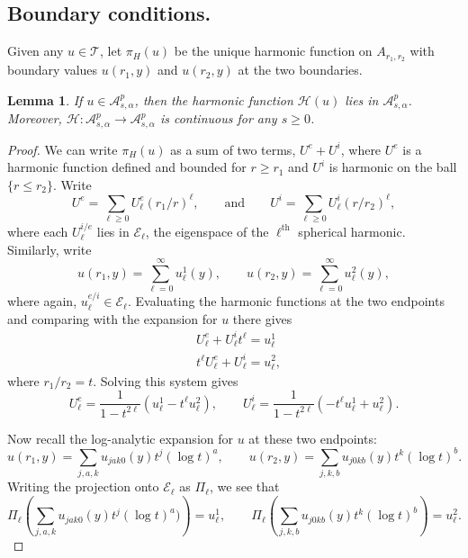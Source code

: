 \documentclass[12pt]{article}
\newtheorem{lem}[thm]{Lemma}
\newcommand{\calA}{{\mathcal A}}
\newcommand{\calE}{{\mathcal E}}
\newcommand{\calH}{\mathcal H}
\newcommand{\calT}{{\mathcal T}}
\begin{document}
\subsection{Boundary conditions.}
Given any $u \in\calT$, let $\pi_H(u)$ be the unique harmonic function on $A_{r_1,r_2}$ with boundary values
$u(r_1,y)$ and $u(r_2, y)$ at the two boundaries.  

\begin{lem}
If $u \in \calA^p_{s,\alpha}$, then the harmonic function $\calH(u)$ lies in $\calA^p_{s,\alpha}$. Moreover, 
$\calH: \calA^p_{s,\alpha} \to \calA^p_{s,\alpha}$ is continuous for any $s \geq 0$.
\end{lem}
\begin{proof}
We can write $\pi_H(u)$ as a sum of two terms, $U^e + U^i$, where $U^e$ is a harmonic function defined and bounded 
for $r \geq r_1$ and $U^i$ is harmonic on the ball $\{r \leq r_2\}$.  Write 
\[
U^e = \sum_{\ell \geq 0} U_\ell^e (r_1/r)^\ell, \qquad \mbox{and}\qquad U^i = \sum_{\ell \geq 0} U_\ell^i (r/r_2)^{\ell},
\]
where each $U_{\ell}^{i/e}$ lies in $\calE_\ell$, the eigenspace of the $\ell^{\mathrm{th}}$ spherical harmonic.  
Similarly, write
\[
u(r_1, y) = \sum_{\ell = 0}^\infty  u_\ell^1(y), \qquad u(r_2, y) = \sum_{\ell=0}^\infty u_\ell^2(y),
\]
where again, $u_\ell^{e/i} \in \calE_\ell$.  Evaluating the harmonic functions at the two endpoints
and comparing with the expansion for $u$ there gives 
\[
\begin{split}
& U_\ell^e + U_\ell^i t^\ell = u_\ell^1 \\
& t^\ell U_\ell^e + U_\ell^i = u_\ell^2,
\end{split}
\]
where $r_1/r_2 = t$. Solving this system gives
\[
U_\ell^e = \frac{1}{1-t^{2\ell}} ( u_\ell^1 - t^\ell u_\ell^2), \qquad U_\ell^i = \frac{1}{1-t^{2\ell}} ( -t^\ell u_\ell^1 + u_\ell^2).
\]

Now recall the log-analytic expansion for $u$ at these two endpoints: 
\[
u(r_1,y) =\sum_{j, a, k} u_{jak0}(y) t^j (\log t)^a , \qquad u(r_2,y) = \sum_{j, k, b} u_{j 0 k b}(y) t^k (\log t)^b.
\]
Writing the projection onto $\calE_\ell$ as $\Pi_\ell$, we see that
\[
\Pi_\ell \left(\sum_{j, a, k} u_{jak0}(y) t^j (\log t)^a)\right) = u_\ell^1, \qquad \Pi_\ell \left( \sum_{j, k, b} u_{j 0 k b}(y) t^k (\log t)^b \right) = u_\ell^2.
\]


\end{proof}
\end{document}
